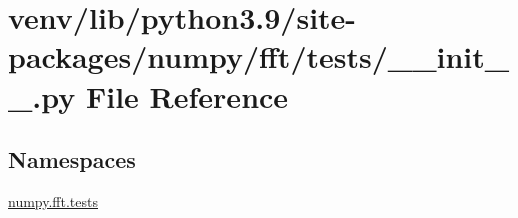 \hypertarget{venv_2lib_2python3_89_2site-packages_2numpy_2fft_2tests_2____init_____8py}{}\section{venv/lib/python3.9/site-\/packages/numpy/fft/tests/\+\_\+\+\_\+init\+\_\+\+\_\+.py File Reference}
\label{venv_2lib_2python3_89_2site-packages_2numpy_2fft_2tests_2____init_____8py}
\subsection*{Namespaces}
\begin{DoxyCompactItemize}
\item 
 \hyperlink{namespacenumpy_1_1fft_1_1tests}{numpy.\+fft.\+tests}
\end{DoxyCompactItemize}
